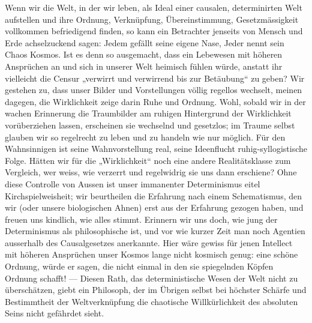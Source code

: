 Wenn wir die Welt, in der wir leben, als Ideal einer causalen, determinirten Welt aufstellen und ihre Ordnung, Verknüpfung, Übereinstimmung, Gesetzmässigkeit vollkommen befriedigend finden, so kann ein Betrachter jenseits von Mensch und Erde achselzuckend sagen: Jedem gefällt seine eigene Nase, Jeder nennt sein Chaos Kosmos. Ist es denn so ausgemacht, dass ein Lebewesen mit höheren Ansprüchen an  und  sich in unserer Welt heimisch fühlen würde, anstatt ihr vielleicht die Censur „verwirrt und verwirrend bis zur Betäubung“ zu geben? Wir gestehen zu, dass unser  Bilder und Vorstellungen völlig regellos wechselt, meinen dagegen, die Wirklichkeit zeige darin Ruhe und Ordnung. Wohl, sobald wir in der wachen Erinnerung die Traumbilder am ruhigen Hintergrund der Wirklichkeit vorüberziehen lassen, erscheinen sie wechselnd und gesetzlos; im Traume selbst glauben wir so regelrecht zu leben und zu handeln wie nur möglich. Für den Wahnsinnigen ist seine Wahnvorstellung real, seine Ideenflucht ruhig-syllogistische Folge. Hätten wir für die „Wirklichkeit“ noch eine andere Realitätsklasse zum Vergleich, wer weiss, wie verzerrt und regelwidrig sie uns dann erschiene? Ohne diese Controlle von Aussen ist unser immanenter Determinismus eitel Kirchspielweisheit; wir beurtheilen die Erfahrung nach einem Schematismus, den wir (oder unsere biologischen Ahnen) erst aus der Erfahrung gezogen haben, und freuen uns kindlich, wie alles stimmt. Erinnern wir uns doch, wie jung der Determinismus als philosophische  ist, und vor wie kurzer Zeit man noch Agentien ausserhalb des Causalgesetzes anerkannte. Hier wäre gewiss für jenen Intellect mit höheren Ansprüchen unser Kosmos lange nicht kosmisch genug: eine schöne Ordnung, würde er sagen, die nicht einmal in den sie spiegelnden Köpfen Ordnung schafft! — Diesen Rath, das deterministische Wesen der Welt nicht zu überschätzen, giebt ein Philosoph, der im Übrigen selbst bei höchster Schärfe und Bestimmtheit der  Weltverknüpfung die chaotische Willkürlichkeit des absoluten Seins nicht gefährdet sieht.
\par

